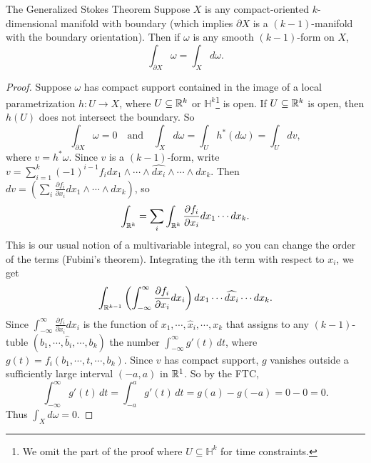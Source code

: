 \begin{namedthm}{The Generalized Stokes Theorem} 
    Suppose $X$ is any compact-oriented $k$-dimensional manifold with boundary (which implies $\partial X$ is a $(k-1)$-manifold with the boundary orientation). Then if $\omega$ is any smooth $(k-1)$-form on $X$, \[
    \int _{\partial X}\omega= \int_X d\omega.
    \] 
\end{namedthm}
\begin{proof}
    Suppose $\omega$ has compact support contained in the image of a local parametrization $h \colon U \to X$, where $U \subseteq \mathbb{R}^k$ or $\mathbb H^k$\footnote{We omit the part of the proof where $U \subseteq \mathbb H^k$ for time constraints.} is open. If $U \subseteq \mathbb{R}^k$ is open, then $h(U)$ does not intersect the boundary. So \[
        \int _{\partial  X}\omega=0\quad \text{and} \quad \int_X d\omega= \int_U h^*(d \omega) = \int _U dv,
    \] where $v= h^*\omega$. Since $v$ is a $(k-1)$-form, write $v= \sum_{i=1}^{k} (-1)^{i-1}f_i  dx_1 \wedge  \cdots \wedge  \widehat{dx_i } \wedge \cdots \wedge dx_k$. Then $dv= \left( \sum _i  \frac{\partial f_i }{\partial x_i }dx_1 \wedge \cdots \wedge dx_k \right) $, so \[
    \int _{\mathbb{R}^k}=\sum _i  \int _{\mathbb{R}^k}\frac{\partial f_i }{\partial x_i }dx_1\cdots dx_k.
\] This is our usual notion of a multivariable integral, so you can change the order of the terms (Fubini's theorem). Integrating the $i$th term with respect to $x_i $, we get \[
\int _{\mathbb{R}^{k-1}}\left( \int_{-\infty}^{\infty} \frac{\partial f_i }{\partial x_i }dx_i  \right) dx_1 \cdots \widehat{dx_i } \cdots  dx_k.
\] Since $\int_{-\infty}^{\infty} \frac{\partial f_i }{\partial x_i }dx_i $ is the function of $x_1,\cdots , \hat{x}_i ,\cdots ,x_k$ that assigns to any $(k-1)$-tuble $(b_1,\cdots ,\hat{b}_i ,\cdots ,b_k)$ the number $ \int_{-\infty}^{\infty} g'(t) \, dt$, where $g(t)=f_i (b_1,\cdots ,t,\cdots ,b_k)$. Since $v$ has compact support, $g$ vanishes outside a sufficiently large interval $(-a,a)$ in $\mathbb{R}^1$. So by the FTC, \[
\int_{-\infty}^{\infty} g'(t) \, dt= \int_{-a}^{a} g'(t) \, dt=g(a)-g(-a)=0-0=0.
\] Thus $\int_X d\omega=0$.
\end{proof}
